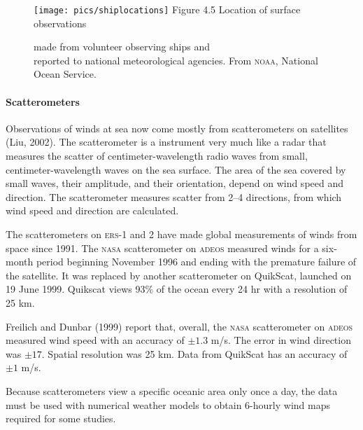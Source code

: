 \begin{figure}[t!]
\centering
\texttt{[image: pics/shiplocations]}
\footnotesize
Figure 4.5 Location of surface observations \rule{0mm}{3ex}made from
volunteer observing ships and\\ reported to national meteorological
agencies. From \textsc{noaa}, National Ocean Service.

\label{fig:shiplocations}
\vspace{-4ex}
\end{figure}

\paragraph{Scatterometers}
 Observations of
winds at sea now come mostly from scatterometers on satellites (Liu,
2002). The scatterometer is a instrument very much like a radar that
measures the scatter of centimeter-wavelength radio waves from small,
centimeter-wavelength waves on the sea surface. The area of the sea
covered by small waves, their amplitude, and their orientation, depend
on wind speed and direction. The scatterometer measures scatter from
2--4 directions, from which wind speed and direction are calculated.

The scatterometers on \textsc{ers-1} and 2 have made global
measurements of winds from space since 1991. The \textsc{nasa}
scatterometer on \textsc{adeos} measured winds
for a six-month period beginning November 1996 and ending with the
premature failure of the satellite. It was replaced by another
scatterometer on QuikScat, launched on 19 June
1999. Quikscat views 93\% of the ocean
every 24 hr with a resolution of 25 km.

Freilich and Dunbar (1999) report that, overall, the \textsc{nasa}
scatterometer on \textsc{adeos}
measured wind speed with an
accuracy of $\pm 1.3$ m/s. The
error in wind direction was $\pm17$\degrees. Spatial resolution was 25
km.  Data from QuikScat has an accuracy of $\pm 1$ m/s.

Because scatterometers view a specific oceanic
area only once a day, the data must be used with numerical weather
models to obtain 6-hourly wind maps required for some studies.

